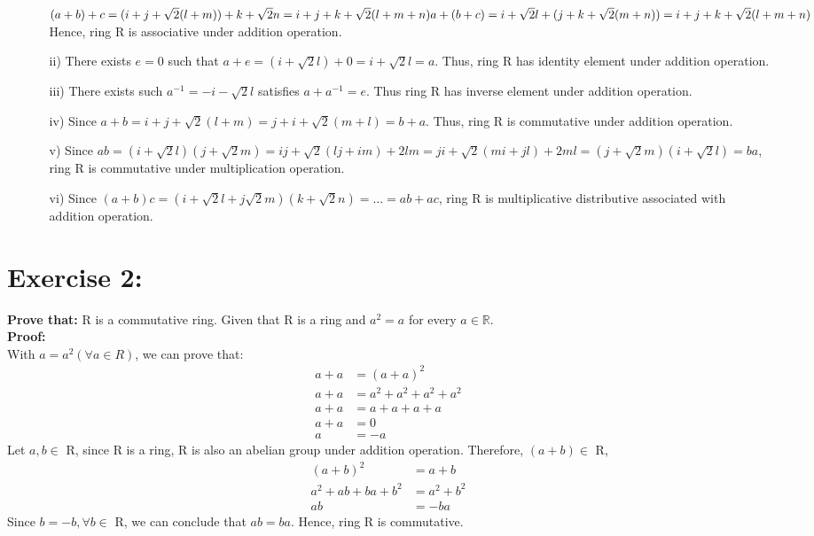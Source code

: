 \documentclass{article}
\newcommand{\R}{\mathbb{R}}
\begin{document}
\begin{itemize}
\begin{enumerate}
						$(a+b)+c = (i+j+\sqrt{2}(l+m))+k+\sqrt{2}n=i+j+k+ \sqrt{2}(l+m+n)\\
						a + (b + c) = i + \sqrt{2}l + (j + k+ \sqrt{2}(m + n)) = i + j + k + \sqrt{2}(l+m+n)$
						Hence, ring R is associative under addition operation.
					\item [ii)]
						There exists $e = 0$ such that $a+e = (i+\sqrt{2}l) + 0 = i+\sqrt{2}l = a$. Thus, ring R has identity element under addition operation.
					\item [iii)]
						There exists such $a^{-1} = -i-\sqrt{2}l$ satisfies $a + a^{-1} = e$. Thus ring R has inverse element under addition operation.
					\item [iv)]
						Since $a+b = i+j+\sqrt{2}(l+m) = j+i + \sqrt{2}(m+l) = b + a$. Thus, ring R is commutative under addition operation.
					\item [v)]
						Since $ab = (i+\sqrt{2}l)(j+\sqrt{2}m) = ij + \sqrt{2}(lj+im) +2lm = ji + \sqrt{2}(mi + jl) + 2ml = (j+\sqrt{2}m)(i+\sqrt{2}l) = ba$, ring R is commutative under multiplication operation.
					\item [vi)]
						Since $(a+b)c=(i+\sqrt{2}l+j\sqrt{2}m)(k+\sqrt{2}n) = ... = ab + ac$, ring R is multiplicative distributive associated with addition operation.
				\end{enumerate}
		\end{itemize}
	
	\section{Exercise 2:}
		\textbf{Prove that:} R is a commutative ring. Given that R is a ring and $a^2 = a$ for every $ a \in \R$.\\
		\textbf{Proof:}\\
		With $a = a^2 (\forall a \in R)$, we can prove that:
		\begin{align*}
			a + a &= (a + a)^2\\
			a + a &= a^2 + a^2 + a^2 + a^2\\
			a + a &= a + a + a + a\\
			a + a &= 0\\
			a &= -a
		\end{align*}
		Let $a, b \in$ R, since R is a ring, R is also an abelian group under addition operation. Therefore, $(a+b) \in$ R,
		\begin{align*}
			(a+b)^2 &= a+b\\
			a^2 + ab + ba + b^2 &= a^2 + b^2\\
			ab &= -ba		
		\end{align*}
		Since $ b = -b, \forall b \in$ R, we can conclude that $ab = ba$. Hence, ring R is commutative.
	
\end{document}
